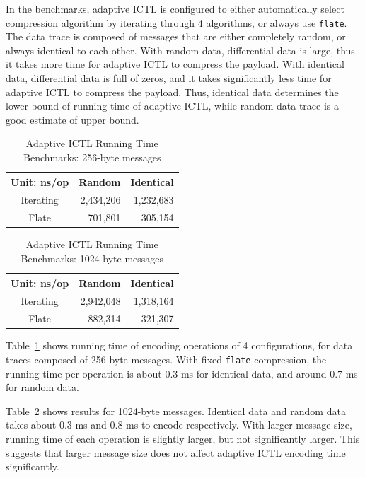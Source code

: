 \documentclass[12pt]{report}
\begin{document}
In the benchmarks, adaptive ICTL is configured to either automatically select compression algorithm by iterating through 4 algorithms, or always use \texttt{flate}. The data trace is composed of messages that are either completely random, or always identical to each other. With random data, differential data is large, thus it takes more time for adaptive ICTL to compress the payload. With identical data, differential data is full of zeros, and it takes significantly less time for adaptive ICTL to compress the payload. Thus, identical data determines the lower bound of running time of adaptive ICTL, while random data trace is a good estimate of upper bound.

\begin{table}[h]
  \begin{center}
    \begin{tabular}{|c|r|r|}
      \hline
      Unit: ns/op & Random & Identical \\ \hline
      Iterating   & 2,434,206 & 1,232,683 \\ \hline
      Flate       & 701,801 & 305,154 \\ \hline
    \end{tabular}
    \caption{\label{tab:ictl_time_256}Adaptive ICTL Running Time Benchmarks: 256-byte messages}
  \end{center}
\end{table}

\begin{table}[h]
  \begin{center}
    \begin{tabular}{|c|r|r|}
      \hline
      Unit: ns/op & Random & Identical \\ \hline
      Iterating   & 2,942,048 & 1,318,164 \\ \hline
      Flate       & 882,314 & 321,307 \\ \hline
    \end{tabular}
    \caption{\label{tab:ictl_time_1024}Adaptive ICTL Running Time Benchmarks: 1024-byte messages}
  \end{center}
\end{table}

Table~\ref{tab:ictl_time_256} shows running time of encoding operations of 4 configurations, for data traces composed of 256-byte messages. With fixed \texttt{flate} compression, the running time per operation is about 0.3 ms for identical data, and around 0.7 ms for random data.

Table~\ref{tab:ictl_time_1024} shows results for 1024-byte messages. Identical data and random data takes about 0.3 ms and 0.8 ms to encode respectively. With larger message size, running time of each operation is slightly larger, but not significantly larger. This suggests that larger message size does not affect adaptive ICTL encoding time significantly.
\end{document}
